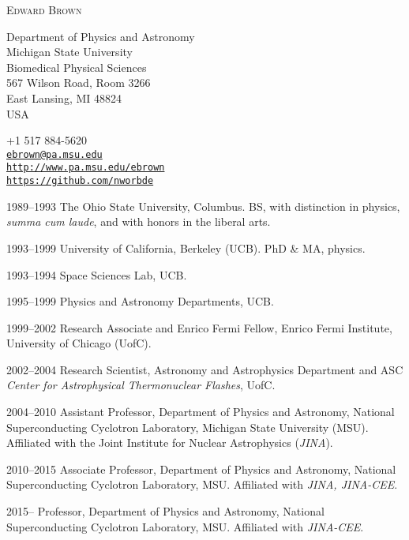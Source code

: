 \documentclass[11pt]{vitae}
\begin{document}
\thispagestyle{empty}
{\LARGE\scshape Edward Brown}

\parbox[t]{186pt}{%
Department of Physics and Astronomy\\
Michigan State University\\
Biomedical Physical Sciences\\
567 Wilson Road, Room 3266\\
East Lansing, MI 48824\\
USA
}
\hfill
\parbox[t]{220pt}{%
+1 517 884-5620\\
\href{mailto:ebrown@pa.msu.edu}{\texttt{ebrown@pa.msu.edu}}\\
\href{http://www.pa.msu.edu/~ebrown}{\texttt{http://www.pa.msu.edu/ebrown}}\\
\href{https://github.com/nworbde}{\texttt{https://github.com/nworbde}}\\
}

\vspace{4.0ex plus1ex minus0.5ex}

\begin{chronlist}
\item[1989--1993] The Ohio State University, Columbus.  BS,
  with distinction in physics, {\em summa cum laude}, and with honors
  in the liberal arts.

\item[1993--1999] University of California, Berkeley (UCB). PhD \& MA, physics.
\end{chronlist}

\begin{chronlist}
\item[1993--1994] Space Sciences Lab, UCB. 
\item[1995--1999] Physics and Astronomy Departments, UCB. 
\item[1999--2002] Research Associate and Enrico Fermi Fellow, Enrico
  Fermi Institute, University of Chicago (UofC).  
\item[2002--2004] Research Scientist, Astronomy and Astrophysics
  Department and ASC \emph{Center for Astrophysical Thermonuclear
    Flashes},  UofC.  
\item[2004--2010] Assistant Professor, Department of Physics and Astronomy, National Superconducting Cyclotron Laboratory, Michigan State University (MSU). Affiliated with the Joint Institute for Nuclear Astrophysics (\emph{JINA}).
\item[2010--2015] Associate Professor, Department of Physics and Astronomy, National Superconducting Cyclotron Laboratory, MSU. Affiliated with \emph{JINA, JINA-CEE}.
\item[2015--] Professor, Department of Physics and Astronomy, National Superconducting Cyclotron Laboratory, MSU. Affiliated with \emph{JINA-CEE}.
\end{chronlist}
\end{document}
